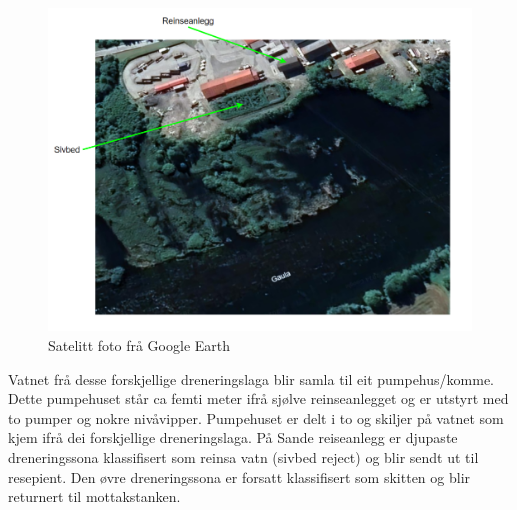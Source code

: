 \begin{figure}[htbp]
    \centering
    \includegraphics[width=1\textwidth]{Bilder/SatelittFoto.png}
    \caption{Satelitt foto frå Google Earth \citep{Google} }\label{fig:Sivbed}
\end{figure}

\newpage

Vatnet frå desse forskjellige dreneringslaga blir samla til eit pumpehus/komme.
Dette pumpehuset står ca femti meter ifrå sjølve reinseanlegget og er utstyrt med to pumper og nokre nivåvipper.
Pumpehuset er delt i to og skiljer på vatnet som kjem ifrå dei forskjellige dreneringslaga.\newline
På Sande reiseanlegg er djupaste dreneringssona klassifisert som reinsa vatn (sivbed reject) og blir sendt ut til resepient.
Den øvre dreneringssona er forsatt klassifisert som skitten og blir returnert til mottakstanken. \newline \newline \newline \newline \newline

